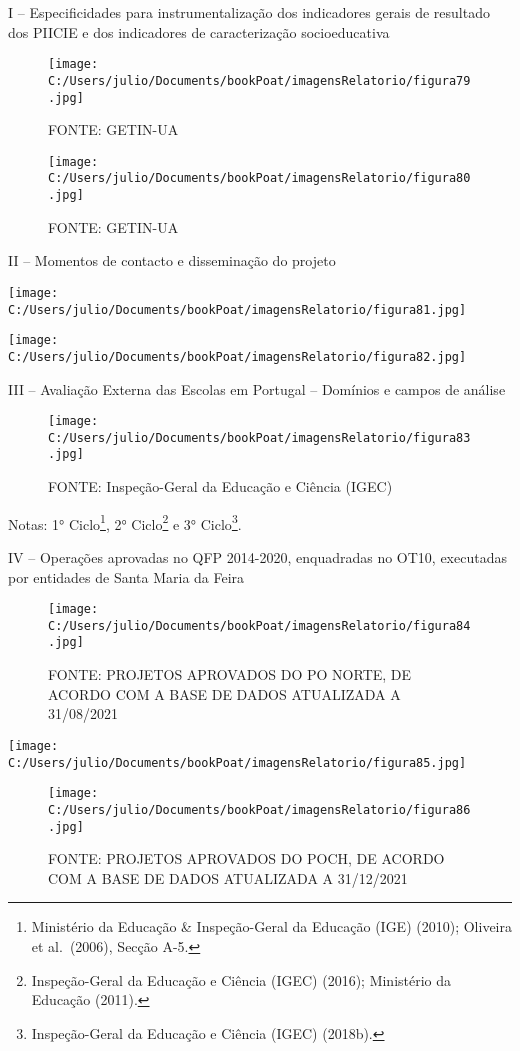 \documentclass[
]{book}
\begin{document}
I -- Especificidades para instrumentalização dos indicadores gerais de resultado dos PIICIE e dos indicadores de caracterização socioeducativa

\begin{figure}
\centering
\texttt{[image: C:/Users/julio/Documents/bookPoat/imagensRelatorio/figura79.jpg]}
\caption{FONTE: GETIN-UA}
\end{figure}

\begin{figure}
\centering
\texttt{[image: C:/Users/julio/Documents/bookPoat/imagensRelatorio/figura80.jpg]}
\caption{FONTE: GETIN-UA}
\end{figure}

II -- Momentos de contacto e disseminação do projeto

\texttt{[image: C:/Users/julio/Documents/bookPoat/imagensRelatorio/figura81.jpg]}

\texttt{[image: C:/Users/julio/Documents/bookPoat/imagensRelatorio/figura82.jpg]}

III -- Avaliação Externa das Escolas em Portugal -- Domínios e campos de análise

\begin{figure}
\centering
\texttt{[image: C:/Users/julio/Documents/bookPoat/imagensRelatorio/figura83.jpg]}
\caption{FONTE: Inspeção-Geral da Educação e Ciência (IGEC)}
\end{figure}

Notas: 1° Ciclo\footnote{Ministério da Educação \& Inspeção-Geral da Educação (IGE) (2010); Oliveira et al.~(2006), Secção A-5.}, 2° Ciclo\footnote{Inspeção-Geral da Educação e Ciência (IGEC) (2016); Ministério da Educação (2011).} e 3° Ciclo\footnote{Inspeção-Geral da Educação e Ciência (IGEC) (2018b).}.

IV -- Operações aprovadas no QFP 2014-2020, enquadradas no OT10, executadas por entidades de Santa Maria da Feira

\begin{figure}
\centering
\texttt{[image: C:/Users/julio/Documents/bookPoat/imagensRelatorio/figura84.jpg]}
\caption{FONTE: PROJETOS APROVADOS DO PO NORTE, DE ACORDO COM A BASE DE DADOS ATUALIZADA A 31/08/2021}
\end{figure}

\texttt{[image: C:/Users/julio/Documents/bookPoat/imagensRelatorio/figura85.jpg]}

\begin{figure}
\centering
\texttt{[image: C:/Users/julio/Documents/bookPoat/imagensRelatorio/figura86.jpg]}
\caption{FONTE: PROJETOS APROVADOS DO POCH, DE ACORDO COM A BASE DE DADOS ATUALIZADA A 31/12/2021}
\end{figure}
\end{document}

